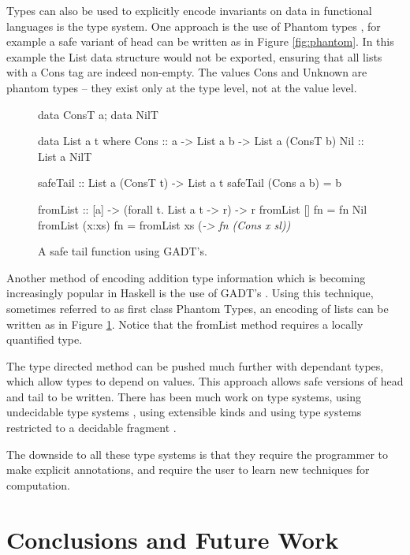 \documentclass[preprint]{sigplanconf}
\newcommand{\C}[1]{\textsf{#1}}
\begin{document}
Types can also be used to explicitly encode invariants on data in functional languages is the type system. One approach is the use of Phantom types \citep{fluet:phantom}, for example a safe variant of \C{head} can be written as in Figure \ref{fig:phantom}. In this example the \C{List} data structure would not be exported, ensuring that all lists with a \C{Cons} tag are indeed non-empty. The values \C{Cons} and \C{Unknown} are phantom types -- they exist only at the type level, not at the value level.

\begin{figure}
\begin{code}
data ConsT a; data NilT

data List a t where
    Cons  :: a -> List a b -> List a (ConsT b)
    Nil   :: List a NilT

safeTail :: List a (ConsT t) -> List a t
safeTail (Cons a b) = b

fromList :: [a] -> (forall t. List a t -> r) -> r
fromList []      fn = fn Nil
fromList (x:xs)  fn = fromList xs (\sl -> fn (Cons x sl))
\end{code}
\caption{A safe \C{tail} function using GADT's.}
\label{fig:gadt}
\end{figure}

Another method of encoding addition type information which is becoming increasingly popular in Haskell is the use of GADT's \citep{spj:gadt}. Using this technique, sometimes referred to as first class Phantom Types, an encoding of lists can be written as in Figure \ref{fig:gadt}. Notice that the \C{fromList} method requires a locally quantified type.

The type directed method can be pushed much further with dependant types, which allow types to depend on values. This approach allows safe versions of \C{head} and \C{tail} to be written. There has been much work on type systems, using undecidable type systems \citep{cayenne, epigram}, using extensible kinds \citep{omega} and using type systems restricted to a decidable fragment \citep{xi:dependent_practical}.

The downside to all these type systems is that they require the programmer to make explicit annotations, and require the user to learn new techniques for computation.


\section{Conclusions and Future Work}
\label{sec:conclusion}
\end{document}
